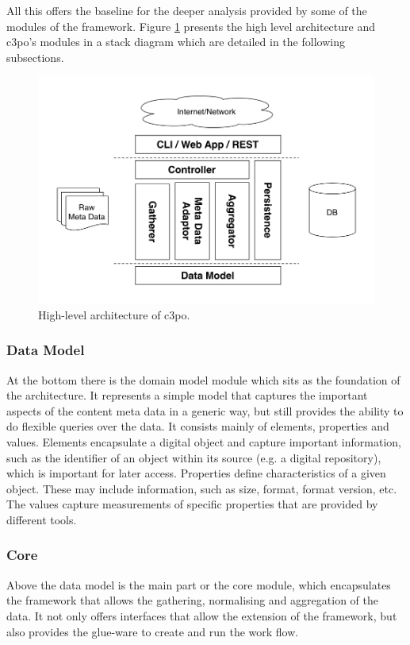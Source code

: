 All this offers the baseline for the deeper analysis provided by some of the modules of the framework. Figure \ref{fig:architecture_highlevel} presents the high level architecture and c3po's modules in a stack diagram which are detailed in the following subsections.


\begin{figure}[t]
\begin{center}
\includegraphics[width=5in]{figures/architecture/c3po_highlevel_architecture.png}
\caption{High-level architecture of c3po.}
\label{fig:architecture_highlevel}
\end{center}
\end{figure}


\subsubsection{Data Model}

At the bottom there is the domain model module which sits as the foundation of the architecture. It represents a simple model that captures the important aspects of the content meta data in a generic way, but still provides the ability to do flexible queries over the data. It consists mainly of elements, properties and values. Elements encapsulate a digital object and capture important information, such as the identifier of an object within its source (e.g. a digital repository), which is important for later access. Properties define characteristics of a given object. These may include information, such as size, format, format version, etc. The values capture measurements of specific properties that are provided by different tools.

\subsubsection{Core}
Above the data model is the main part or the core module, which encapsulates the framework that allows the gathering, normalising and aggregation of the data. It not only offers interfaces that allow the extension of the framework, but also provides the glue-ware to create and run the work flow.


